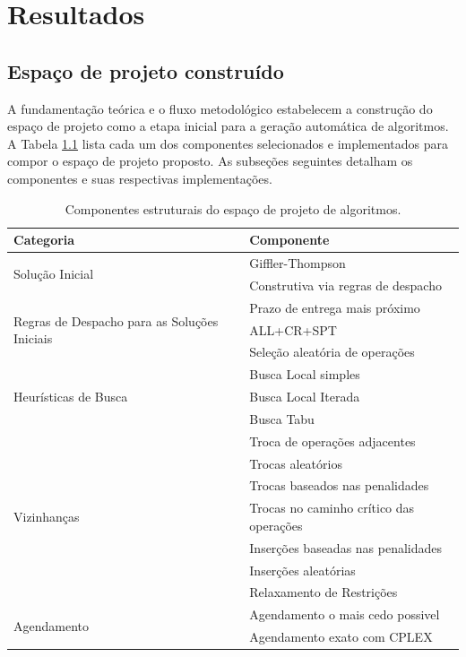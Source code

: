 \chapter{Resultados} \label{chapt:resultados}

\section{Espaço de projeto construído} \label{sect:espacoproj}

A fundamentação teórica e o fluxo metodológico estabelecem a construção do espaço de projeto como a etapa inicial para a geração automática de algoritmos. A Tabela \ref{tab:componentes_projeto} lista cada um dos componentes selecionados e implementados para compor o espaço de projeto proposto. As subseções seguintes detalham os componentes e suas respectivas implementações.

\begin{table}[htpb]
\centering
\caption{Componentes estruturais do espaço de projeto de algoritmos.}
\label{tab:componentes_projeto}
\begin{tabularx}{\textwidth}{l l }
\toprule
\textbf{Categoria} & \textbf{Componente} \\ \midrule
\multirow{2}{*}{Solução Inicial} & Giffler-Thompson \\
 & Construtiva via regras de despacho \\ \midrule
\multirow{3}{*}{Regras de Despacho para as Soluções Iniciais} & Prazo de entrega mais próximo \\
 & ALL+CR+SPT \\
 & Seleção aleatória de operações \\ \midrule
\multirow{3}{*}{Heurísticas de Busca} & Busca Local simples\\
 & Busca Local Iterada \\
 & Busca Tabu \\ \midrule
\multirow{7}{*}{Vizinhanças} & Troca de operações adjacentes \\
 & Trocas aleatórios \\
 & Trocas baseados nas penalidades \\
 & Trocas no caminho crítico das operações \\
 & Inserções baseadas nas penalidades \\
 & Inserções aleatórias \\
 & Relaxamento de Restrições \\ \midrule
\multirow{2}{*}{Agendamento} & Agendamento o mais cedo possivel \\
 & Agendamento exato com CPLEX \\ \bottomrule
\end{tabularx}
\end{table}

